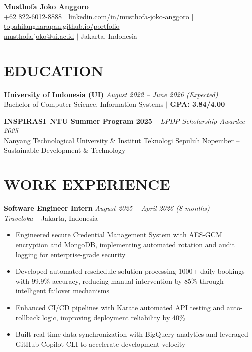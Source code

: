 \documentclass[10pt,a4paper]{article}
\begin{document}
\begin{center}
    {\LARGE \textbf{Musthofa Joko Anggoro}} \\[4pt]
    +62 822-6012-8888 $|$ 
    \href{https://linkedin.com/in/musthofa-joko-anggoro}{linkedin.com/in/musthofa-joko-anggoro} $|$ 
    \href{https://topahilangharapan.github.io/portfolio}{topahilangharapan.github.io/portfolio} \\
    \href{mailto:musthofa.joko@ui.ac.id}{musthofa.joko@ui.ac.id} $|$ 
    Jakarta, Indonesia
\end{center}

\vspace{-6pt}

\section*{EDUCATION}
\vspace{-2pt}
\textbf{University of Indonesia (UI)} \hfill \textit{August 2022 – June 2026 (Expected)} \\
Bachelor of Computer Science, Information Systems $|$ \textbf{GPA: 3.84/4.00}

\textbf{INSPIRASI–NTU Summer Program 2025} – \textit{LPDP Scholarship Awardee} \hfill \textit{2025} \\
Nanyang Technological University \& Institut Teknologi Sepuluh Nopember – Sustainable Development \& Technology

\section*{WORK EXPERIENCE}
\vspace{-2pt}

\textbf{Software Engineer Intern} \hfill \textit{August 2025 – April 2026 (8 months)} \\
\textit{Traveloka} – Jakarta, Indonesia \\[-6pt]
\begin{itemize}
    \item Engineered secure Credential Management System with AES-GCM encryption and MongoDB, implementing automated rotation and audit logging for enterprise-grade security
    \item Developed automated reschedule solution processing 1000+ daily bookings with 99.9\% accuracy, reducing manual intervention by 85\% through intelligent failover mechanisms
    \item Enhanced CI/CD pipelines with Karate automated API testing and auto-rollback logic, improving deployment reliability by 40\%
    \item Built real-time data synchronization with BigQuery analytics and leveraged GitHub Copilot CLI to accelerate development velocity
\end{itemize}
\end{document}
